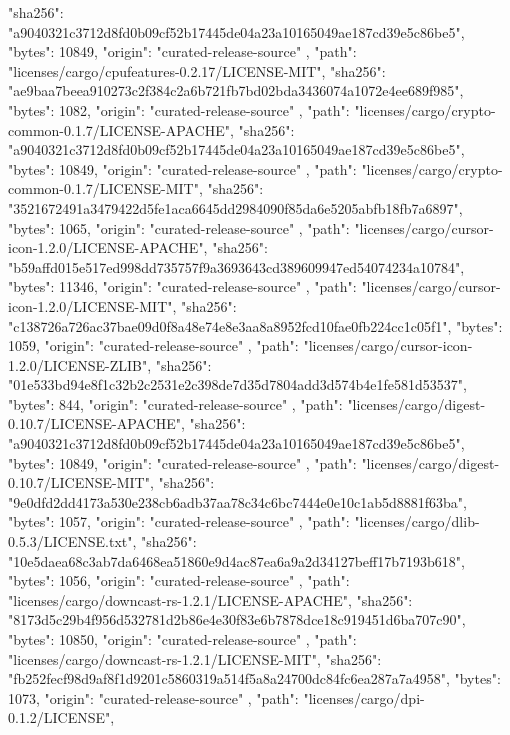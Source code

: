 {{      "sha256": "a9040321c3712d8fd0b09cf52b17445de04a23a10165049ae187cd39e5c86be5",
      "bytes": 10849,
      "origin": "curated-release-source"
    },
    {
      "path": "licenses/cargo/cpufeatures-0.2.17/LICENSE-MIT",
      "sha256": "ae9baa7beea910273c2f384c2a6b721fb7bd02bda3436074a1072e4ee689f985",
      "bytes": 1082,
      "origin": "curated-release-source"
    },
    {
      "path": "licenses/cargo/crypto-common-0.1.7/LICENSE-APACHE",
      "sha256": "a9040321c3712d8fd0b09cf52b17445de04a23a10165049ae187cd39e5c86be5",
      "bytes": 10849,
      "origin": "curated-release-source"
    },
    {
      "path": "licenses/cargo/crypto-common-0.1.7/LICENSE-MIT",
      "sha256": "3521672491a3479422d5fe1aca6645dd2984090f85da6e5205abfb18fb7a6897",
      "bytes": 1065,
      "origin": "curated-release-source"
    },
    {
      "path": "licenses/cargo/cursor-icon-1.2.0/LICENSE-APACHE",
      "sha256": "b59affd015e517ed998dd735757f9a3693643cd389609947ed54074234a10784",
      "bytes": 11346,
      "origin": "curated-release-source"
    },
    {
      "path": "licenses/cargo/cursor-icon-1.2.0/LICENSE-MIT",
      "sha256": "c138726a726ac37bae09d0f8a48e74e8e3aa8a8952fcd10fae0fb224cc1c05f1",
      "bytes": 1059,
      "origin": "curated-release-source"
    },
    {
      "path": "licenses/cargo/cursor-icon-1.2.0/LICENSE-ZLIB",
      "sha256": "01e533bd94e8f1c32b2c2531e2c398de7d35d7804add3d574b4e1fe581d53537",
      "bytes": 844,
      "origin": "curated-release-source"
    },
    {
      "path": "licenses/cargo/digest-0.10.7/LICENSE-APACHE",
      "sha256": "a9040321c3712d8fd0b09cf52b17445de04a23a10165049ae187cd39e5c86be5",
      "bytes": 10849,
      "origin": "curated-release-source"
    },
    {
      "path": "licenses/cargo/digest-0.10.7/LICENSE-MIT",
      "sha256": "9e0dfd2dd4173a530e238cb6adb37aa78c34c6bc7444e0e10c1ab5d8881f63ba",
      "bytes": 1057,
      "origin": "curated-release-source"
    },
    {
      "path": "licenses/cargo/dlib-0.5.3/LICENSE.txt",
      "sha256": "10e5daea68c3ab7da6468ea51860e9d4ac87ea6a9a2d34127beff17b7193b618",
      "bytes": 1056,
      "origin": "curated-release-source"
    },
    {
      "path": "licenses/cargo/downcast-rs-1.2.1/LICENSE-APACHE",
      "sha256": "8173d5c29b4f956d532781d2b86e4e30f83e6b7878dce18c919451d6ba707c90",
      "bytes": 10850,
      "origin": "curated-release-source"
    },
    {
      "path": "licenses/cargo/downcast-rs-1.2.1/LICENSE-MIT",
      "sha256": "fb252fecf98d9af8f1d9201c5860319a514f5a8a24700dc84fc6ea287a7a4958",
      "bytes": 1073,
      "origin": "curated-release-source"
    },
    {
      "path": "licenses/cargo/dpi-0.1.2/LICENSE",
}}
